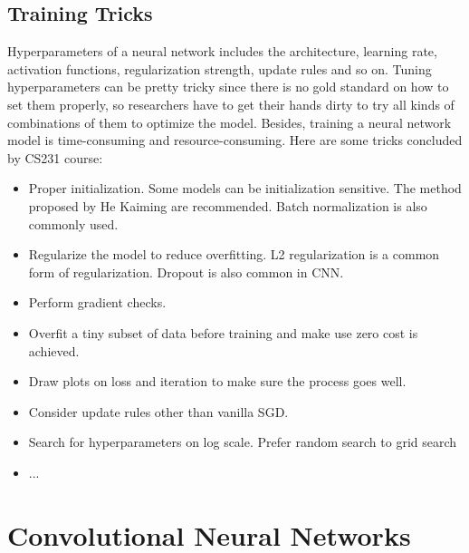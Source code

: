 \documentclass{article} %
\begin{document}
\subsection{Training Tricks}
Hyperparameters of a neural network includes the architecture, learning rate, activation functions, regularization strength, update rules and so on. Tuning hyperparameters can be pretty tricky since there is no gold standard on how to set them properly, so researchers have to get their hands dirty to try all kinds of combinations of them to optimize the model. Besides, training a neural network model is time-consuming and resource-consuming. Here are some tricks concluded by CS231 course:
\begin{itemize}
	\item Proper initialization. Some models can be initialization sensitive. The method proposed by He Kaiming are recommended. Batch normalization is also commonly used.
	\item Regularize the model to reduce overfitting. L2 regularization is a common form of regularization. Dropout is also common in CNN.
	\item Perform gradient checks.
	\item Overfit a tiny subset of data before training and make use zero cost is achieved.
	\item Draw plots on loss and iteration to make sure the process goes well.
	\item Consider update rules other than vanilla SGD.
	\item Search for hyperparameters on log scale. Prefer random search to grid search
	\item ...
\end{itemize}


\section{Convolutional Neural Networks}
\end{document}
